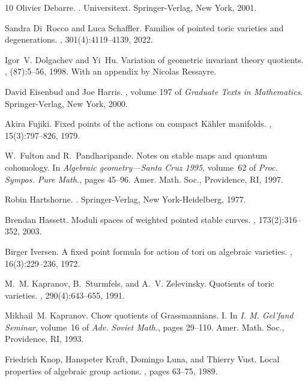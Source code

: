 \documentclass[10pt,a4paper]{article}
\numberwithin{equation}{section}
\theoremstyle{definition}
\theoremstyle{remark}
\begin{document}
\begin{thebibliography}{10}
Olivier Debarre.
.
\newblock Universitext. Springer-Verlag, New York, 2001.

Sandra Di~Rocco and Luca Schaffler.
\newblock Families of pointed toric varieties and degenerations.
, 301(4):4119--4139, 2022.

Igor~V. Dolgachev and Yi~Hu.
\newblock Variation of geometric invariant theory quotients.
, (87):5--56, 1998.
\newblock With an appendix by Nicolas Ressayre.

David Eisenbud and Joe Harris.
, volume 197 of {\em Graduate Texts in
  Mathematics}.
\newblock Springer-Verlag, New York, 2000.

Akira Fujiki.
\newblock Fixed points of the actions on compact {K}\"{a}hler manifolds.
, 15(3):797--826, 1979.

W.~Fulton and R.~Pandharipande.
\newblock Notes on stable maps and quantum cohomology.
\newblock In {\em Algebraic geometry---{S}anta {C}ruz 1995}, volume~62 of {\em
  Proc. Sympos. Pure Math.}, pages 45--96. Amer. Math. Soc., Providence, RI,
  1997.

Robin Hartshorne.
.
\newblock Springer-Verlag, New York-Heidelberg, 1977.

Brendan Hassett.
\newblock Moduli spaces of weighted pointed stable curves.
, 173(2):316--352, 2003.

Birger Iversen.
\newblock A fixed point formula for action of tori on algebraic varieties.
, 16(3):229--236, 1972.

M.~M. Kapranov, B.~Sturmfels, and A.~V. Zelevinsky.
\newblock Quotients of toric varieties.
, 290(4):643--655, 1991.

Mikhail~M. Kapranov.
\newblock Chow quotients of {G}rassmannians. {I}.
\newblock In {\em I. {M}. {G}el'fand {S}eminar}, volume~16 of {\em Adv. Soviet
  Math.}, pages 29--110. Amer. Math. Soc., Providence, RI, 1993.

Friedrich Knop, Hanspeter Kraft, Domingo Luna, and Thierry Vust.
\newblock Local properties of algebraic group actions.
, pages 63--75, 1989.


\end{thebibliography}
\end{document}
